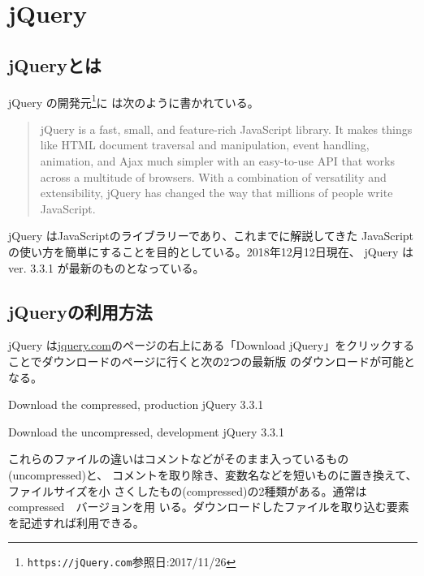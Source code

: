 \chapter{jQuery}
\section{jQueryとは}
jQuery の開発元\footnote{\texttt{https://jQuery.com}参照日:2017/11/26}に
は次のように書かれている。
\begin{quotation}
jQuery is a fast, small, and feature-rich JavaScript library. It makes
 things like HTML document traversal and manipulation, event handling,
 animation, and Ajax much simpler with an easy-to-use API that works
 across a multitude of browsers. With a combination of versatility and
 extensibility, jQuery has changed the way that millions of people write
 JavaScript.
 \end{quotation}
jQuery はJavaScriptのライブラリーであり、これまでに解説してきた
JavaScriptの使い方を簡単にすることを目的としている。2018年12月12日現在、
jQuery は ver. 3.3.1 が最新のものとなっている。

\section{jQueryの利用方法}
jQuery は\href{jquery.com}{jquery.com}のページの右上にある「Download
jQuery」をクリックすることでダウンロードのページに行くと次の2つの最新版
のダウンロードが可能となる。

Download the compressed, production jQuery 3.3.1

Download the uncompressed, development jQuery 3.3.1

これらのファイルの違いはコメントなどがそのまま入っているもの(uncompressed)と、
コメントを取り除き、変数名などを短いものに置き換えて、ファイルサイズを小
さくしたもの(compressed)の2種類がある。通常は compressed　バージョンを用
いる。ダウンロードしたファイルを取り込む要素を記述すれば利用できる。

